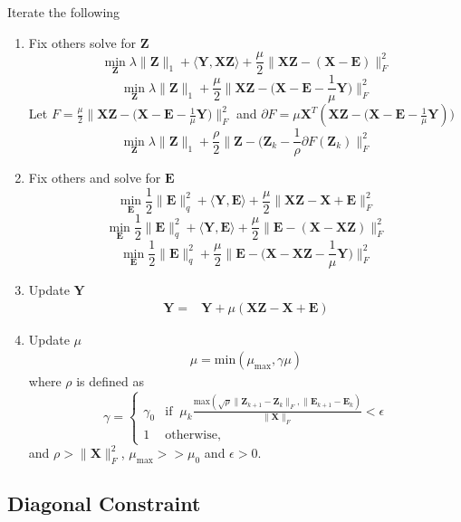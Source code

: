 \documentclass{article}
\begin{document}
Iterate the following
\begin{enumerate}
\item Fix others  solve for $\mathbf Z$
\[
\min_{\mathbf{Z}} \lambda\|\mathbf Z\|_{1} + \langle \mathbf{Y, XZ} \rangle + \frac{\mu}{2} \|\mathbf{XZ - (X - E) } \|_F^2 
\]
\[
\min_{\mathbf{Z}} \lambda\|\mathbf Z\|_{1} + \frac{\mu}{2} \|\mathbf{XZ - (X - E} - \frac{1}{\mu} \mathbf Y ) \|_F^2 
\]
Let $F = \frac{\mu}{2} \|\mathbf{XZ - (X - E} - \frac{1}{\mu} \mathbf Y ) \|_F^2$ and $\partial F =  \mu \mathbf X^T (\mathbf{XZ - (X - E} - \frac{1}{\mu} \mathbf Y ))$
\[
\min_{\mathbf{Z}} \lambda\|\mathbf Z\|_{1} + \frac{\rho}{2} \| \mathbf Z - (\mathbf Z_{k} - \frac{1}{\rho} \partial F(\mathbf Z_{k}) \|_F^2 
\]


\item Fix others and solve for $\mathbf E$
\[
\min_{\mathbf{E}} \frac12\|\mathbf E \|^2_q + \langle \mathbf{Y, E} \rangle + \frac{\mu}{2} \|\mathbf{XZ - X + E } \|_F^2 
\]
\[
\min_{\mathbf{E}} \frac12\|\mathbf E \|^2_q + \langle \mathbf{Y, E} \rangle + \frac{\mu}{2} \|\mathbf{E - (X - XZ)} \|_F^2 
\]
\[
\min_{\mathbf{E}} \frac12\|\mathbf E \|^2_q  + \frac{\mu}{2} \|\mathbf{E - (X - XZ} - \frac{1}{\mu} \mathbf Y) \|_F^2 
\]


\item Update $\mathbf Y$
\begin{align*}
\mathbf Y =& \mathbf Y + \mu (\mathbf{XZ - X + E})
\end{align*}

\item Update $\mu$
\begin{align*}
 \mu = \textrm{min}( \mu_{\text{max}}, \gamma \mu)
\end{align*}
where $\rho$ is defined as
\[
\gamma = 
\begin{cases}
\gamma_0 & \text{if} \;\; \mu_k \frac{\textrm{max} (  \sqrt{\rho} \| \mathbf Z_{k+1} - \mathbf Z_{k}  \|_F  , \|  \mathbf E_{k+1} - \mathbf E_{k})}{\| \mathbf X \|_F} < \epsilon \\
1 & \text{otherwise,}
\end{cases}
\]
and $\rho > \| \mathbf X \|_F^2$,  $\mu_{\text{max}} >>  \mu_0$ and $\epsilon > 0$.

\end{enumerate}

\subsection{Diagonal Constraint}
\end{document}
